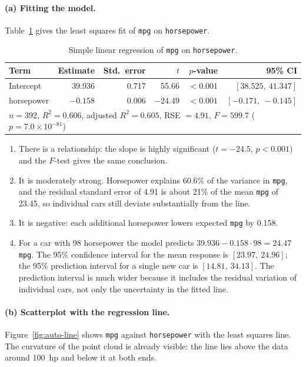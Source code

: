 \documentclass[11pt]{article}
\begin{document}
\paragraph{(a) Fitting the model.}
Table~\ref{tab:auto-8a} gives the least squares fit of \texttt{mpg} on \texttt{horsepower}.

\begin{table}[H]
  \centering
  \begin{tabular}{lrrrrr}
    \toprule
    Term & Estimate & Std.\ error & $t$ & $p$-value & 95\% CI \\
    \midrule
    Intercept  & 39.936   & 0.717 & 55.66  & $<0.001$ & $[38.525,\ 41.347]$ \\
    horsepower & $-0.158$ & 0.006 & $-24.49$ & $<0.001$ & $[-0.171,\ -0.145]$ \\
    \midrule
    \multicolumn{6}{l}{$n = 392$, \quad $R^2 = 0.606$, \quad adjusted $R^2 = 0.605$, \quad RSE $= 4.91$, \quad $F = 599.7$ ($p = 7.0\times10^{-81}$)} \\
    \bottomrule
  \end{tabular}
  \caption{Simple linear regression of \texttt{mpg} on \texttt{horsepower}.}
  \label{tab:auto-8a}
\end{table}

\begin{enumerate}
  \item[i.] There is a relationship: the slope is highly significant ($t = -24.5$, $p < 0.001$) and the $F$-test gives the same conclusion.
  \item[ii.] It is moderately strong. Horsepower explains 60.6\% of the variance in \texttt{mpg}, and the residual standard error of 4.91 is about 21\% of the mean \texttt{mpg} of 23.45, so individual cars still deviate substantially from the line.
  \item[iii.] It is negative: each additional horsepower lowers expected \texttt{mpg} by 0.158.
  \item[iv.] For a car with 98 horsepower the model predicts $39.936 - 0.158\cdot 98 = 24.47$ \texttt{mpg}. The 95\% confidence interval for the mean response is $[23.97,\ 24.96]$; the 95\% prediction interval for a single new car is $[14.81,\ 34.13]$. The prediction interval is much wider because it includes the residual variation of individual cars, not only the uncertainty in the fitted line.
\end{enumerate}

\paragraph{(b) Scatterplot with the regression line.}
Figure~\ref{fig:auto-line} shows \texttt{mpg} against \texttt{horsepower} with the least squares line. The curvature of the point cloud is already visible: the line lies above the data around 100~hp and below it at both ends.
\end{document}
